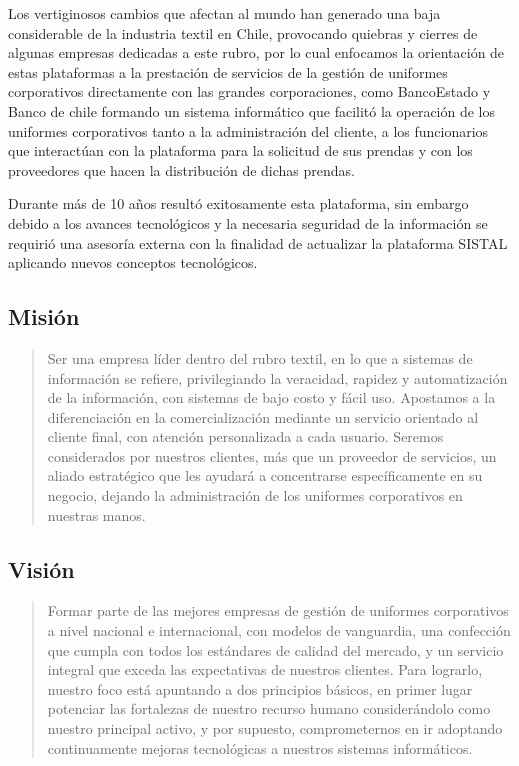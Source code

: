 Los vertiginosos cambios que afectan al mundo han generado una baja considerable de la industria textil en Chile, provocando quiebras y cierres de algunas empresas dedicadas a este rubro, por lo cual enfocamos la orientación de estas plataformas a la prestación de servicios de la gestión de uniformes corporativos directamente con las grandes corporaciones, como BancoEstado y Banco de chile formando un sistema informático que facilitó la operación de los uniformes corporativos tanto a la administración del cliente, a los funcionarios que interactúan con la plataforma para la solicitud de sus prendas y con los proveedores que hacen la distribución de dichas prendas.

Durante más de 10 años resultó exitosamente esta plataforma, sin embargo debido a los avances tecnológicos y la necesaria seguridad de la información se requirió una asesoría externa con la finalidad de actualizar la plataforma SISTAL aplicando nuevos conceptos tecnológicos.

\subsection{Misión}

\begin{quote}
    Ser una empresa líder dentro del rubro textil, en lo que a sistemas de información se refiere, privilegiando la veracidad, rapidez y automatización de la información, con sistemas de bajo costo y fácil uso. Apostamos a la diferenciación en la comercialización mediante un servicio orientado al cliente final, con atención personalizada a cada usuario. Seremos considerados por nuestros clientes, más que un proveedor de servicios, un aliado estratégico que les ayudará a concentrarse específicamente en su negocio, dejando la administración de los uniformes corporativos en nuestras manos.
\end{quote}

\subsection{Visión}

\begin{quote}
    Formar parte de las mejores empresas de gestión de uniformes corporativos a nivel nacional e internacional, con modelos de vanguardia, una confección que cumpla con todos los estándares de calidad del mercado, y un servicio integral que exceda las expectativas de nuestros clientes. Para lograrlo, nuestro foco está apuntando a dos principios básicos, en primer lugar potenciar las fortalezas de nuestro recurso humano considerándolo como nuestro principal activo, y por supuesto, comprometernos en ir adoptando continuamente mejoras tecnológicas a nuestros sistemas informáticos.
\end{quote}

